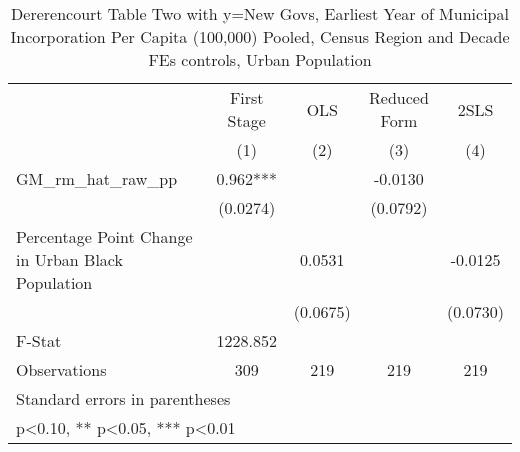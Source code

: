 \begin{table}[htbp]\centering
\def\sym#1{\ifmmode^{#1}\else\(^{#1}\)\fi}
\caption{Dererencourt Table Two with y=New Govs, Earliest Year of Municipal Incorporation Per Capita (100,000) Pooled, Census Region and Decade FEs controls, Urban Population}
\begin{tabular}{l*{4}{c}}
\toprule
                    & First Stage   &         OLS   &Reduced Form   &        2SLS   \\
                    &\multicolumn{1}{c}{(1)}   &\multicolumn{1}{c}{(2)}   &\multicolumn{1}{c}{(3)}   &\multicolumn{1}{c}{(4)}   \\
\midrule
GM\_rm\_hat\_raw\_pp    &       0.962***&               &     -0.0130   &               \\
                    &    (0.0274)   &               &    (0.0792)   &               \\
\addlinespace
Percentage Point Change in Urban Black Population&               &      0.0531   &               &     -0.0125   \\
                    &               &    (0.0675)   &               &    (0.0730)   \\
\midrule
F-Stat              &    1228.852   &               &               &               \\
Observations        &         309   &         219   &         219   &         219   \\
\bottomrule
\multicolumn{5}{l}{\footnotesize Standard errors in parentheses}\\
\multicolumn{5}{l}{\footnotesize * p<0.10, ** p<0.05, *** p<0.01}\\
\end{tabular}
\end{table}
